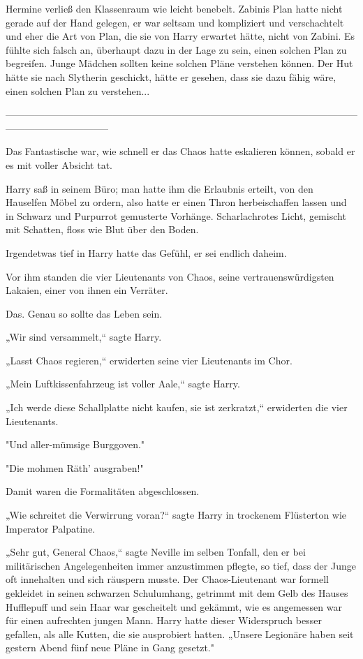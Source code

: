 {Hermine verließ den Klassenraum wie leicht benebelt. Zabinis Plan hatte nicht gerade auf der Hand gelegen, er war seltsam und kompliziert und verschachtelt und eher die Art von Plan, die sie von Harry erwartet hätte, nicht von Zabini. Es fühlte sich falsch an, überhaupt dazu in der Lage zu sein, einen solchen Plan zu begreifen. Junge Mädchen sollten keine solchen Pläne verstehen können. Der Hut hätte sie nach Slytherin geschickt, hätte er gesehen, dass sie dazu fähig wäre, einen solchen Plan zu verstehen...

--------------------------------------------------------------------------------------------------------------------------------------------

\hfill\break Das Fantastische war, wie schnell er das Chaos hatte eskalieren können, sobald er es mit voller Absicht tat.

Harry saß in seinem Büro; man hatte ihm die Erlaubnis erteilt, von den Hauselfen Möbel zu ordern, also hatte er einen Thron herbeischaffen lassen und in Schwarz und Purpurrot gemusterte Vorhänge. Scharlachrotes Licht, gemischt mit Schatten, floss wie Blut über den Boden.

Irgendetwas tief in Harry hatte das Gefühl, er sei endlich daheim.

Vor ihm standen die vier Lieutenants von Chaos, seine vertrauenswürdigsten Lakaien, einer von ihnen ein Verräter.

Das. Genau so sollte das Leben sein.

„Wir sind versammelt,“ sagte Harry.

„Lasst Chaos regieren,“ erwiderten seine vier Lieutenants im Chor.

„Mein Luftkissenfahrzeug ist voller Aale,“ sagte Harry.

„Ich werde diese Schallplatte nicht kaufen, sie ist zerkratzt,“ erwiderten die vier Lieutenants.

"Und aller-mümsige Burggoven."

"Die mohmen Räth' ausgraben!"

Damit waren die Formalitäten abgeschlossen.

„Wie schreitet die Verwirrung voran?“ sagte Harry in trockenem Flüsterton wie Imperator Palpatine.

„Sehr gut, General Chaos,“ sagte Neville im selben Tonfall, den er bei militärischen Angelegenheiten immer anzustimmen pflegte, so tief, dass der Junge oft innehalten und sich räuspern musste. Der Chaos-Lieutenant war formell gekleidet in seinen schwarzen Schulumhang, getrimmt mit dem Gelb des Hauses Hufflepuff und sein Haar war gescheitelt und gekämmt, wie es angemessen war für einen aufrechten jungen Mann. Harry hatte dieser Widerspruch besser gefallen, als alle Kutten, die sie ausprobiert hatten. „Unsere Legionäre haben seit gestern Abend fünf neue Pläne in Gang gesetzt."

}

